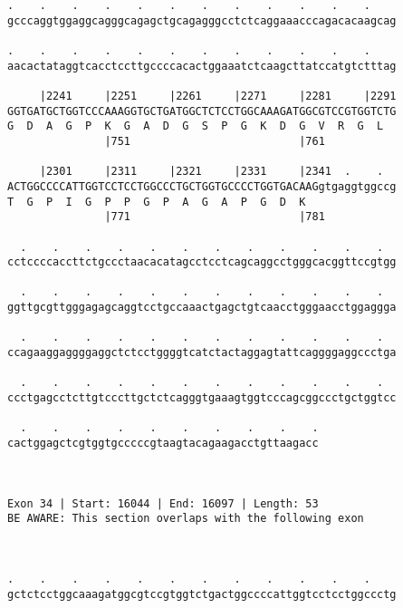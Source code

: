 \documentclass{article}
\begin{document}
\begin{Verbatim}
.    .    .    .    .    .    .    .    .    .    .    .    
gcccaggtggaggcagggcagagctgcagagggcctctcaggaaacccagacacaagcag
                                                            
.    .    .    .    .    .    .    .    .    .    .    .    
aacactataggtcacctccttgccccacactggaaatctcaagcttatccatgtctttag
                                                            
     |2241     |2251     |2261     |2271     |2281     |2291
GGTGATGCTGGTCCCAAAGGTGCTGATGGCTCTCCTGGCAAAGATGGCGTCCGTGGTCTG
G  D  A  G  P  K  G  A  D  G  S  P  G  K  D  G  V  R  G  L  
               |751                          |761           
  
     |2301     |2311     |2321     |2331     |2341  .    .  
ACTGGCCCCATTGGTCCTCCTGGCCCTGCTGGTGCCCCTGGTGACAAGgtgaggtggccg
T  G  P  I  G  P  P  G  P  A  G  A  P  G  D  K              
               |771                          |781           
  
  .    .    .    .    .    .    .    .    .    .    .    .  
cctccccaccttctgccctaacacatagcctcctcagcaggcctgggcacggttccgtgg
                                                            
  .    .    .    .    .    .    .    .    .    .    .    .  
ggttgcgttgggagagcaggtcctgccaaactgagctgtcaacctgggaacctggaggga
                                                            
  .    .    .    .    .    .    .    .    .    .    .    .  
ccagaaggaggggaggctctcctggggtcatctactaggagtattcaggggaggccctga
                                                            
  .    .    .    .    .    .    .    .    .    .    .    .  
ccctgagcctcttgtcccttgctctcagggtgaaagtggtcccagcggccctgctggtcc
                                                            
  .    .    .    .    .    .    .    .    .    .
cactggagctcgtggtgcccccgtaagtacagaagacctgttaagacc
                                                
                                                
 
Exon 34 | Start: 16044 | End: 16097 | Length: 53
BE AWARE: This section overlaps with the following exon



.    .    .    .    .    .    .    .    .    .    .    .    
gctctcctggcaaagatggcgtccgtggtctgactggccccattggtcctcctggccctg
                                                            

\end{Verbatim}
\end{document}
